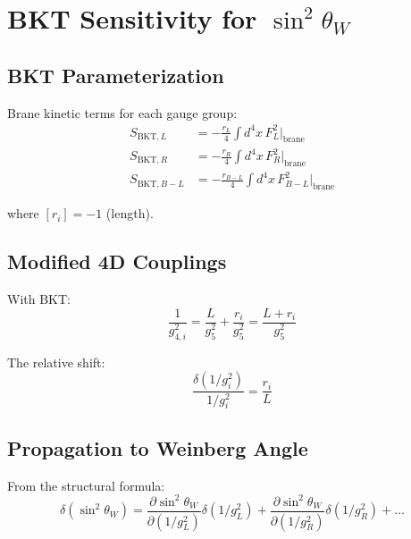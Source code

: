 \documentclass[11pt,a4paper]{article}
\begin{document}
\section{BKT Sensitivity for $\sin^2\theta_W$}
\label{sec:bkt}

\subsection{BKT Parameterization}
\label{subsec:bkt-param}

Brane kinetic terms for each gauge group:
\begin{align}
\label{eq:bkt-L}
S_{\text{BKT},L} &= -\frac{r_L}{4} \int d^4x \, F_L^2 |_{\text{brane}} \\
\label{eq:bkt-R}
S_{\text{BKT},R} &= -\frac{r_R}{4} \int d^4x \, F_R^2 |_{\text{brane}} \\
\label{eq:bkt-BL}
S_{\text{BKT},B-L} &= -\frac{r_{B-L}}{4} \int d^4x \, F_{B-L}^2 |_{\text{brane}}
\end{align}

where $[r_i] = -1$ (length).

\subsection{Modified 4D Couplings}
\label{subsec:modified-couplings}

With BKT:
\begin{equation}
\label{eq:g4-bkt}
\frac{1}{g_{4,i}^2} = \frac{L}{g_5^2} + \frac{r_i}{g_5^2} = \frac{L + r_i}{g_5^2}
\end{equation}

The relative shift:
\begin{equation}
\label{eq:bkt-shift}
\frac{\delta(1/g_i^2)}{1/g_i^2} = \frac{r_i}{L}
\end{equation}

\subsection{Propagation to Weinberg Angle}
\label{subsec:bkt-propagation}

From the structural formula:
\begin{equation}
\label{eq:sin2-bkt-variation}
\delta(\sin^2\theta_W) = \frac{\partial \sin^2\theta_W}{\partial(1/g_L^2)} \delta(1/g_L^2)
+ \frac{\partial \sin^2\theta_W}{\partial(1/g_R^2)} \delta(1/g_R^2) + \ldots
\end{equation}
\end{document}
